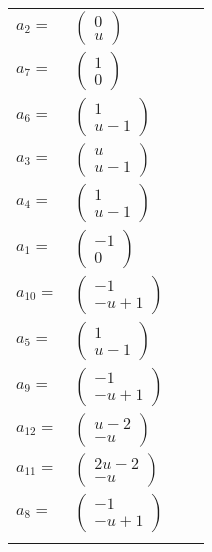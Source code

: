 \documentclass[1p]{elsarticle_modified}
\theoremstyle{definition}
\begin{document}
\begin{tabular}{m{7pt} m{180pt} m{7pt} m{180pt} }
\flushright $a_{2}=$&$\begin{pmatrix}0\\u\end{pmatrix}$ \\
\flushright $a_{7}=$&$\begin{pmatrix}1\\0\end{pmatrix}$ \\
\flushright $a_{6}=$&$\begin{pmatrix}1\\u-1\end{pmatrix}$ \\
\flushright $a_{3}=$&$\begin{pmatrix}u\\u-1\end{pmatrix}$ \\
\flushright $a_{4}=$&$\begin{pmatrix}1\\u-1\end{pmatrix}$ \\
\flushright $a_{1}=$&$\begin{pmatrix}-1\\0\end{pmatrix}$ \\
\flushright $a_{10}=$&$\begin{pmatrix}-1\\- u+1\end{pmatrix}$ \\
\flushright $a_{5}=$&$\begin{pmatrix}1\\u-1\end{pmatrix}$ \\
\flushright $a_{9}=$&$\begin{pmatrix}-1\\- u+1\end{pmatrix}$ \\
\flushright $a_{12}=$&$\begin{pmatrix}u-2\\- u\end{pmatrix}$ \\
\flushright $a_{11}=$&$\begin{pmatrix}2 u-2\\- u\end{pmatrix}$ \\
\flushright $a_{8}=$&$\begin{pmatrix}-1\\- u+1\end{pmatrix}$\\&\end{tabular}
\end{document}
